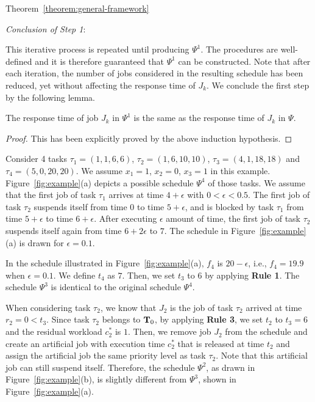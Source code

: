 \begin{appProof}{Theorem~\ref{theorem:general-framework}}
 
\noindent\textit{Conclusion of Step 1}:

This iterative process is repeated until producing $\Psi^1$. The procedures are well-defined and it is therefore guaranteed that $\Psi^1$ can be constructed. Note that after each iteration, the number of jobs considered in the resulting schedule has been reduced, yet without affecting the response time of $J_k$. We conclude the first step by the following lemma.

 \begin{Lemma}
\label{lem:step-1-conclusion}
 The response time of job $J_k$ in $\Psi^1$ is the same as the response time of $J_k$ in $\Psi$.
\end{Lemma}
\begin{proof}
  This has been explicitly proved by the above induction hypothesis.
\end{proof}


\begin{example}
\label{ex:proof_step1}
Consider 4 tasks $\tau_1 =(1,1,6,6)$, $\tau_2 =(1,6,10,10)$, $\tau_3 =(4,1,18,18)$ and $\tau_4 =(5,0,20,20)$.
We assume  $x_1=1$, $x_2=0$, $x_3=1$ in this example.
Figure~\ref{fig:example}(a) depicts a possible schedule $\Psi^4$ of those tasks. We assume that the first job of task $\tau_1$ arrives
at time $4+\epsilon$ with $0 < \epsilon < 0.5$. The first job
of task $\tau_2$ suspends itself from time $0$ to time $5+\epsilon$,
and is blocked by task $\tau_1$ from time $5+\epsilon$ to time
$6+\epsilon$. After executing $\epsilon$ amount
of time, the first job of task $\tau_2$ suspends itself again from
time $6+2\epsilon$ to $7$. The schedule in Figure~\ref{fig:example}(a) is drawn for $\epsilon=0.1$.
   
In the schedule illustrated in Figure~\ref{fig:example}(a), $f_4$ is
$20-\epsilon$, i.e., $f_4=19.9$ when $\epsilon=0.1$.  We define $t_4$
as $7$. Then, we set $t_3$ to $6$ by applying {\bf Rule 1}. The
schedule $\Psi^3$ is identical to the original schedule $\Psi^4$.

When considering task $\tau_2$, we know that $J_2$ is the job of task
$\tau_2$ arrived at time $r_2=0 < t_3$. Since task $\tau_2$ belongs to ${\bf
  T}_0$, by applying {\bf Rule 3}, we set $t_2$ to $t_3=6$ and the
residual workload $c_2^*$ is $1$. Then, we remove job $J_2$ from the
schedule and create an artificial job with execution time $c_2^*$ that
is released at time $t_2$ and assign the artificial job the same priority level as task
$\tau_2$. Note that this artificial job can still suspend itself. Therefore, the schedule $\Psi^2$, as drawn in 
Figure~\ref{fig:example}(b), is slightly different from $\Psi^3$, shown in Figure~\ref{fig:example}(a).


\end{example}
\end{appProof}
